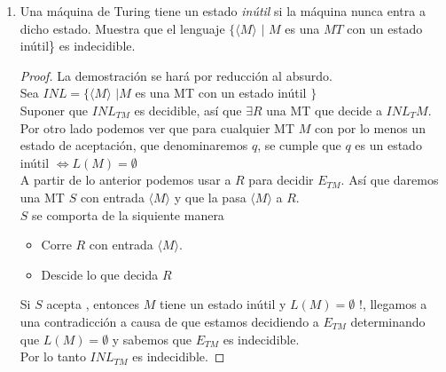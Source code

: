 \documentclass[letterpaper,10pt]{article}
\begin{document}
\begin{enumerate}
       \newpage
       \item Una máquina de Turing tiene un estado \textit{inútil} si la
       máquina nunca entra a dicho estado. Muestra que el lenguaje
       $\{\langle M \rangle$ $|$ $M$ es una $MT$ con un estado inútil\}
       es indecidible.
       \begin{proof}
       		La demostración se hará por reducción al absurdo.\\
       		Sea $INL=\{ \langle M \rangle$ $| M $ es una MT con un estado inútil $\}$\\
       		Suponer que $INL_{TM}$ es decidible, así que $\exists R$ una MT que decide a $INL_TM$.\\
       		Por otro lado podemos ver que para cualquier MT $M$ con por lo menos un estado de aceptación, que denominaremos $q$, se cumple que $q$ es un estado inútil $ \Leftrightarrow L(M)= \emptyset$\\
       		
       		A partir de lo anterior podemos usar a $R$ para decidir $E_{TM}$. Así que daremos una MT $S$ con entrada $\langle M \rangle$ y que la pasa $\langle M \rangle$ a $R$.\\
       		$S$ se comporta de la siquiente manera
       		\begin{itemize}
       			\item Corre $R$ con entrada $\langle M \rangle$.
       			\item Descide lo que decida $R$
       		\end{itemize}    
       		Si $S$ acepta , entonces $M$ tiene un estado inútil y $L(M)=\emptyset $ $!$, llegamos a una contradicción a causa de que estamos decidiendo a $E_{TM}$ determinando que $L(M)=\emptyset$ y sabemos que $E_{TM}$ es indecidible.\\
       		Por lo tanto $INL_{TM}$ es indecidible.
       		
       \end{proof}
       

\end{enumerate}
\end{document}
